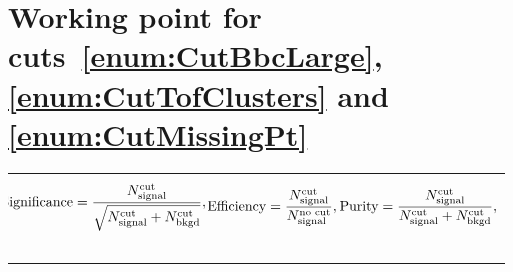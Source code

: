 \section{Working point for cuts~\ref{enum:CutBbcLarge}, \ref{enum:CutTofClusters} and \ref{enum:CutMissingPt}}

\begin{tabulary}{\textwidth}{LLL}
\begin{equation}\label{eq:significance}\hspace*{-10pt}
	\text{Significance} = \frac{N_{\text{signal}}^{\text{cut}}}{\sqrt{N_{\text{signal}}^{\text{cut}} + N_{\text{bkgd}}^{\text{cut}}}},
\end{equation}~~~~~~~~~~~~~~~~~&
\begin{equation}\label{eq:efficiency}\hspace*{-10pt}
	\text{Efficiency} = \frac{N_{\text{signal}}^{\text{cut}}}{N_{\text{signal}}^{\text{no~cut}}},
\end{equation}~~~~~~~~~~~~~~&
\begin{equation}\label{eq:purity}\hspace*{-9pt}
	\text{Purity} = \frac{N_{\text{signal}}^{\text{cut}}}{N_{\text{signal}}^{\text{cut}}+N_{\text{bkgd}}^{\text{cut}}},
\end{equation}~~~~~~~~~~~~~~~
\end{tabulary}


